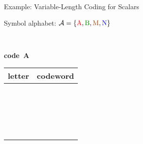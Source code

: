 \begin{frame}{Example: Variable-Length Coding for Scalars}
  \vspace{-1.5ex}
  \bit\TabPositions{9.2em,22.5em}
\item Symbol alphabet:
  $\set{A}=\{{\color{red}{\text{A}}},
  {\color{officegreen}{\text{B}}},
  {\color{saddlebrown}{\text{M}}},{\color{blue}{\text{N}}}\}$
\item<2->[]~\\[-1ex]
  {
  \begin{minipage}{0.32\linewidth}
    \begin{center}
      {\bf code~A}\\[.5ex]
      \begin{tabular}{|c|l|}
        \hline
    \color{black}letter & \color{black}codeword\\
    \hline\rule{0ex}{2.5ex}%
    \color{red}{A}         & ~~~\color{red}{00}\\
    \color{officegreen}{B} & ~~~\color{officegreen}{01}\\
    \color{saddlebrown}{M} & ~~~\color{saddlebrown}{10}\\
    \color{blue}{N}        & ~~~\color{blue}{11}\\
        \hline
    \end{tabular}
    \end{center}
  \end{minipage}
  \begin{minipage}{0.32\linewidth}
    \end{minipage}
  \begin{minipage}{0.32\linewidth}
\end{minipage}}
\end{frame}
